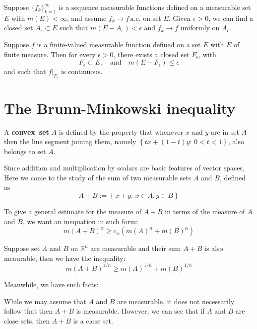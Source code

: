 \documentclass{ctexbook}
\begin{document}
\begin{thm}[Egorov]
    Suppose $\{f_k\}_{k=1}^\infty$ is a sequence measurable functions defined on a measurable set $E$ with $m(E) < \infty$, and
    assume $f_k \rightarrow f \, \text{a.e.}$ on set $E$. Given $\epsilon > 0$, we can find a closed set $A_\epsilon \subset E$
    such that $m(E-A_\epsilon) < \epsilon$ and $f_k \rightarrow f$ uniformly on $A_\epsilon$.
\end{thm}

\begin{thm}[Lusin]
    Suppose $f$ is a finite-valued measurable function defined on a set $E$ with $E$ of finite measure. Then for every $\epsilon > 0$,
    there exists a closed set $F_\epsilon$, with \[F_\epsilon \subset E, \quad \text{and} \quad m(E-F_\epsilon) \leq \epsilon\]
    and such that $f|_{F_\epsilon}$ is continuous. 
\end{thm}

\section{The Brunn-Minkowski inequality}

\begin{define}
    A \textbf{convex~set} $A$ is defined by the property that whenever $x$ and $y$ are in set $A$ then the line segment joining
    them, namely $\left\{tx+(1-t)y:\,0<t<1\right\}$, also belongs to set $A$.
\end{define} 

Since addition and multiplication by scalars are basic features of vector spaces, Here we come to the study of the sum of two
measurable sets $A$ and $B$, defined as
\[A + B := \left\{x+y:\, x\in A, y \in B\right\} \]

To give a general estimate for the measure of $A+B$  in terms of the measure of $A$ and $B$, we want an inequation in such form:
\[ m(A+B)^\alpha \geq c_\alpha(m(A)^\alpha + m(B)^\alpha)\]

\begin{thm}
    Suppose set $A$ and $B$ on $\mathbb{R}^n$ are measurable and their sum $A+B$ is also meaurable, then we have the inequality:
    \[m(A+B)^{1/n} \geq m(A)^{1/n} + m(B)^{1/n}\]
\end{thm}
Meanwhile, we have such facts:
\begin{fact}
    While we may assume that $A$ and $B$ are measurable, it does not necessarily follow that then $A + B$ is measurable.
    However, we can see that if $A$ and $B$ are close sets, then $A+B$ is a close set. 
\end{fact}
\end{document}
